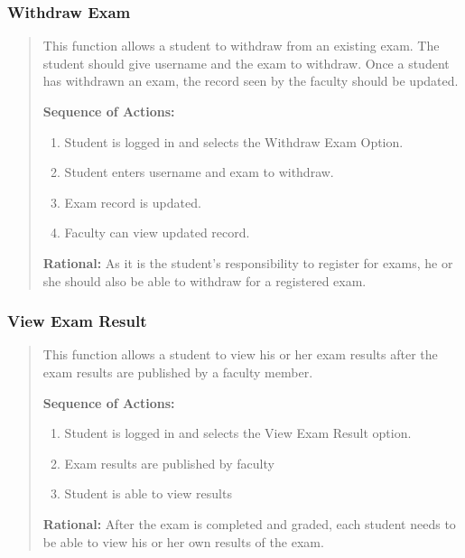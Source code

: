    \subsubsection{Withdraw Exam}
   \begin{quote} %
         This function allows a student to withdraw from an existing exam. The
         student should give username and the exam to withdraw. Once a
         student has withdrawn an exam, the record seen by the faculty should
         be updated.
         
         \textbf{Sequence of Actions:}
         \begin{enumerate}
            \item Student is logged in and selects the Withdraw Exam Option.
            \item Student enters username and exam to withdraw.
            \item Exam record is updated.
            \item Faculty can view updated record.
         \end{enumerate}

         \textbf{Rational:}
         As it is the student's responsibility to register for exams, he or she
         should also be able to withdraw for a registered exam.
   \end{quote} %

   \subsubsection{View Exam Result}
   \begin{quote} %
         This function allows a student to view his or her exam results after
         the exam results are published by a faculty member.
         
         \textbf{Sequence of Actions:}
         \begin{enumerate}
            \item Student is logged in and selects the View Exam Result option.
            \item Exam results are published by faculty
            \item Student is able to view results
         \end{enumerate}

         \textbf{Rational:}
         After the exam is completed and graded, each student needs to be able
         to view his or her own results of the exam.
   \end{quote} %

